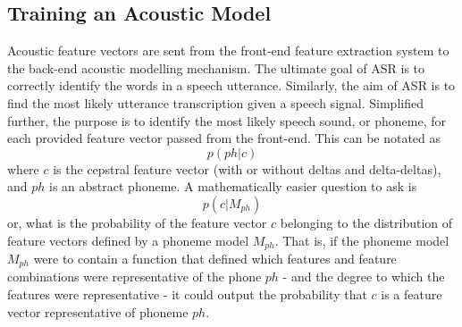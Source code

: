 \subsection{Training an Acoustic Model}\label{sec:acoust-mod}

Acoustic feature vectors are sent from the front-end feature extraction system to the back-end acoustic modelling mechanism.  The ultimate goal of ASR is to correctly identify the words in a speech utterance. Similarly, the aim of ASR is to find the most likely utterance transcription given a speech signal.  Simplified further, the purpose is to identify the most likely speech sound, or phoneme, for each provided feature vector passed from the front-end.  This can be notated as \begin{equation} p(ph|c) \end{equation} where $c$ is the cepstral feature vector (with or without deltas and delta-deltas), and $ph$ is an abstract phoneme.  A mathematically easier question to ask is \begin{equation} p(c|M_{ph}) \end{equation} or, what is the probability of the feature vector $c$ belonging to the distribution of feature vectors defined by a phoneme model $M_{ph}$.  That is, if the phoneme model $M_{ph}$ were to contain a function that defined which features and feature combinations were representative of the phone $ph$ - and the degree to which the features were representative - it could output the probability that $c$ is a feature vector representative of phoneme $ph$.

